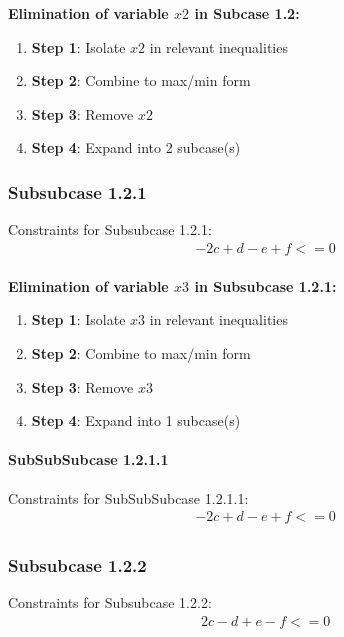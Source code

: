 \documentclass{article}
\begin{document}
\textbf{Elimination of variable $x2$ in Subcase 1.2:}

\begin{enumerate}
\item \textbf{Step 1}: Isolate $x2$ in relevant inequalities
\item \textbf{Step 2}: Combine to max/min form
\item \textbf{Step 3}: Remove $x2$
\item \textbf{Step 4}: Expand into 2 subcase(s)
\end{enumerate}

\subsubsection{Subsubcase 1.2.1}

Constraints for Subsubcase 1.2.1:
\begin{align}
& - 2 c + d - e + f <= 0 \\
\end{align}

\textbf{Elimination of variable $x3$ in Subsubcase 1.2.1:}

\begin{enumerate}
\item \textbf{Step 1}: Isolate $x3$ in relevant inequalities
\item \textbf{Step 2}: Combine to max/min form
\item \textbf{Step 3}: Remove $x3$
\item \textbf{Step 4}: Expand into 1 subcase(s)
\end{enumerate}

\paragraph{SubSubSubcase 1.2.1.1}

Constraints for SubSubSubcase 1.2.1.1:
\begin{align}
& - 2 c + d - e + f <= 0 \\
\end{align}

\subsubsection{Subsubcase 1.2.2}

Constraints for Subsubcase 1.2.2:
\begin{align}
& 2 c - d + e - f <= 0 \\
\end{align}
\end{document}
